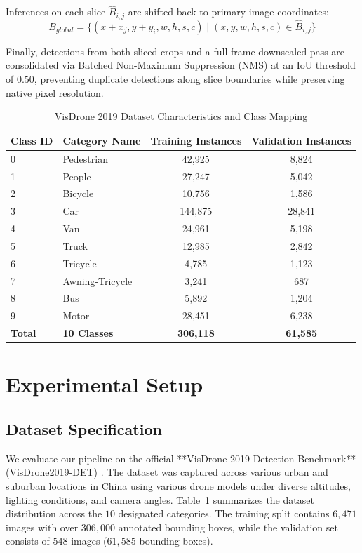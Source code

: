 \documentclass[conference]{IEEEtran}
\begin{document}
Inferences on each slice $\hat{B}_{i,j}$ are shifted back to primary image coordinates:
\begin{equation}
B_{global} = \{ (x + x_j, y + y_i, w, h, s, c) \mid (x, y, w, h, s, c) \in \hat{B}_{i,j} \}
\end{equation}

Finally, detections from both sliced crops and a full-frame downscaled pass are consolidated via Batched Non-Maximum Suppression (NMS) at an IoU threshold of $0.50$, preventing duplicate detections along slice boundaries while preserving native pixel resolution.

\begin{table}[!t]
\caption{VisDrone 2019 Dataset Characteristics and Class Mapping}
\label{tab:visdrone_specs}
\centering
\begin{tabular}{llcc}
\toprule
\textbf{Class ID} & \textbf{Category Name} & \textbf{Training Instances} & \textbf{Validation Instances} \\
\midrule
0 & Pedestrian & 42,925 & 8,824 \\
1 & People & 27,247 & 5,042 \\
2 & Bicycle & 10,756 & 1,586 \\
3 & Car & 144,875 & 28,841 \\
4 & Van & 24,961 & 5,198 \\
5 & Truck & 12,985 & 2,842 \\
6 & Tricycle & 4,785 & 1,123 \\
7 & Awning-Tricycle & 3,241 & 687 \\
8 & Bus & 5,892 & 1,204 \\
9 & Motor & 28,451 & 6,238 \\
\midrule
\textbf{Total} & \textbf{10 Classes} & \textbf{306,118} & \textbf{61,585} \\
\bottomrule
\end{tabular}
\end{table}

\section{Experimental Setup}

\subsection{Dataset Specification}
We evaluate our pipeline on the official **VisDrone 2019 Detection Benchmark** (VisDrone2019-DET) \cite{zhu2021detection}. The dataset was captured across various urban and suburban locations in China using various drone models under diverse altitudes, lighting conditions, and camera angles. Table~\ref{tab:visdrone_specs} summarizes the dataset distribution across the $10$ designated categories. The training split contains $6,471$ images with over $306,000$ annotated bounding boxes, while the validation set consists of $548$ images ($61,585$ bounding boxes).
\end{document}
